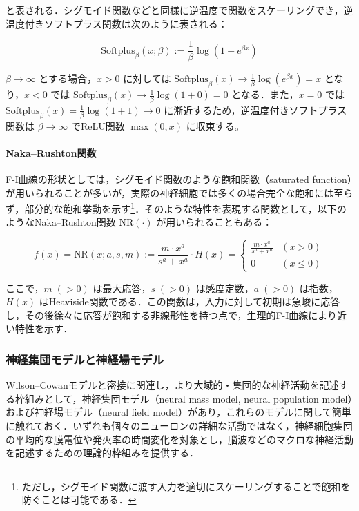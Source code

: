 \documentclass[titlepage]{ltjsbook}
\begin{document}
と表される．シグモイド関数などと同様に逆温度で関数をスケーリングでき，逆温度付きソフトプラス関数は次のように表される：

\begin{equation}
\textrm{Softplus}_\beta(x; \beta):=\frac{1}{\beta}\log(1+e^{\beta x})
\end{equation}

$\beta \to \infty$ とする場合，$x>0$ に対しては $\mathrm{Softplus}_\beta(x)\to \frac{1}{\beta} \log(e^{\beta x}) = x$ となり，$x<0$ では $\mathrm{Softplus}_\beta(x)\to \frac{1}{\beta} \log(1+0) = 0$ となる．また，$x=0$ では $\mathrm{Softplus}_\beta(x)=\frac{1}{\beta}\log(1+1)\to 0$ に漸近するため，逆温度付きソフトプラス関数は $\beta \to \infty$ でReLU関数 $\max(0, x)$ に収束する。

\paragraph{Naka–Rushton関数}
F-I曲線の形状としては，シグモイド関数のような飽和関数（saturated function）が用いられることが多いが，実際の神経細胞では多くの場合完全な飽和には至らず，部分的な飽和挙動を示す\footnote{ただし，シグモイド関数に渡す入力を適切にスケーリングすることで飽和を防ぐことは可能である．}．そのような特性を表現する関数として，以下のようなNaka–Rushton関数 $\textrm{NR}(\cdot)$ が用いられることもある\citep{naka1966s,sclar1990coding,wilson1999spikes}：

\begin{equation}
f(x) = \textrm{NR}(x; a, s, m):=\frac{m\cdot x^a}{s^a + x^a} \cdot H(x)
=\begin{cases}
\frac{m\cdot x^a}{s^a + x^a} & (x > 0) \\
0 & (x \leq 0)
\end{cases}
\end{equation}

ここで，$m\;(>0)$ は最大応答，$s\;(>0)$ は感度定数，$a\;(>0)$ は指数，$H(x)$ はHeaviside関数である．この関数は，入力に対して初期は急峻に応答し，その後徐々に応答が飽和する非線形性を持つ点で，生理的F-I曲線により近い特性を示す．

\subsubsection{神経集団モデルと神経場モデル}
Wilson–Cowanモデルと密接に関連し，より大域的・集団的な神経活動を記述する枠組みとして，神経集団モデル（neural mass model, neural population model）および神経場モデル（neural field model）があり，これらのモデルに関して簡単に触れておく．いずれも個々のニューロンの詳細な活動ではなく，神経細胞集団の平均的な膜電位や発火率の時間変化を対象とし，脳波などのマクロな神経活動を記述するための理論的枠組みを提供する．
\end{document}

